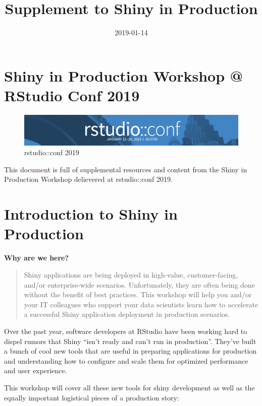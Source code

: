 \documentclass[]{book}
\title{Supplement to Shiny in Production}
\author{}
\date{2019-01-14}
\theoremstyle{definition}
\theoremstyle{definition}
\theoremstyle{definition}
\theoremstyle{remark}
\begin{document}
\maketitle

{
\setcounter{tocdepth}{1}
\tableofcontents
}
\hypertarget{shiny-in-production-workshop-rstudio-conf-2019}{%
\chapter{Shiny in Production Workshop @ RStudio Conf
2019}\label{shiny-in-production-workshop-rstudio-conf-2019}}

\begin{figure}
\centering
\includegraphics{imgs/conf-banner.png}
\caption{rstudio::conf 2019}
\end{figure}

This document is full of supplemental resources and content from the
Shiny in Production Workshop delievered at rstudio::conf 2019.

\hypertarget{course-intro}{%
\chapter{Introduction to Shiny in Production}\label{course-intro}}

\textbf{Why are we here?}

\begin{quote}
Shiny applications are being deployed in high-value, customer-facing,
and/or enterprise-wide scenarios. Unfortunately, they are often being
done without the benefit of best practices. This workshop will help you
and/or your IT colleagues who support your data scientists learn how to
accelerate a successful Shiny application deployment in production
scenarios.
\end{quote}

Over the past year, software developers at RStudio have been working
hard to dispel rumors that Shiny ``isn't ready and can't run in
production''. They've built a bunch of cool new tools that are useful in
preparing applications for production and understanding how to configure
and scale them for optimized performance and user experience.

This workshop will cover all these new tools for shiny development as
well as the equally important logistical pieces of a production story:
\end{document}
